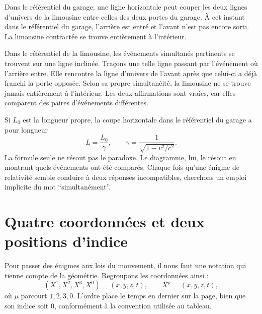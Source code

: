 Dans le référentiel du garage, une ligne horizontale peut couper les deux lignes d’univers de la limousine entre celles des deux portes du garage. À cet instant dans le référentiel du garage, l’arrière est entré et l’avant n’est pas encore sorti. La limousine contractée se trouve entièrement à l’intérieur.

Dans le référentiel de la limousine, les événements simultanés pertinents se trouvent sur une ligne inclinée. Traçons une telle ligne passant par l’événement où l’arrière entre. Elle rencontre la ligne d’univers de l’avant après que celui-ci a déjà franchi la porte opposée. Selon sa propre simultanéité, la limousine ne se trouve jamais entièrement à l’intérieur. Les deux affirmations sont vraies, car elles comparent des paires d’événements différentes.

\begin{classroomqa}\end{classroomqa}

Si \(L_0\) est la longueur propre, la coupe horizontale dans le référentiel du garage a pour longueur
\begin{equation}
L=\frac{L_0}{\gamma},
\qquad
\gamma=\frac{1}{\sqrt{1-v^2/c^2}}.
\end{equation}
La formule seule ne résout pas le paradoxe. Le diagramme, lui, le résout en montrant quels événements ont été comparés. Chaque fois qu’une énigme de relativité semble conduire à deux réponses incompatibles, cherchons un emploi implicite du mot ``simultanément''.

\section{Quatre coordonnées et deux positions d’indice}

Pour passer des énigmes aux lois du mouvement, il nous faut une notation qui tienne compte de la géométrie. Regroupons les coordonnées ainsi :
\begin{equation}
(X^1,X^2,X^3,X^0)=(x,y,z,t),
\qquad X^\mu=(x,y,z,t),
\end{equation}
où \(\mu\) parcourt \(1,2,3,0\). L’ordre place le temps en dernier sur la page, bien que son indice soit \(0\), conformément à la convention utilisée au tableau.


